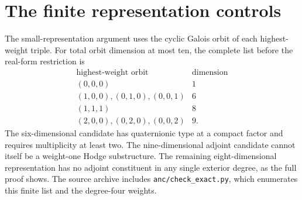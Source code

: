 \section{The finite representation controls}\label{round26:app:carrier}
The small-representation argument uses the cyclic Galois orbit of each highest-weight triple. For total orbit dimension at most ten, the complete list before the real-form restriction is
\[
\begin{array}{c|c}
\text{highest-weight orbit}&\text{dimension}\\\hline
(0,0,0)&1\\
(1,0,0),(0,1,0),(0,0,1)&6\\
(1,1,1)&8\\
(2,0,0),(0,2,0),(0,0,2)&9.
\end{array}
\]
The six-dimensional candidate has quaternionic type at a compact factor and requires multiplicity at least two. The nine-dimensional adjoint candidate cannot itself be a weight-one Hodge substructure. The remaining eight-dimensional representation has no adjoint constituent in any single exterior degree, as the full proof shows. The source archive includes \texttt{anc/check\_exact.py}, which enumerates this finite list and the degree-four weights.
